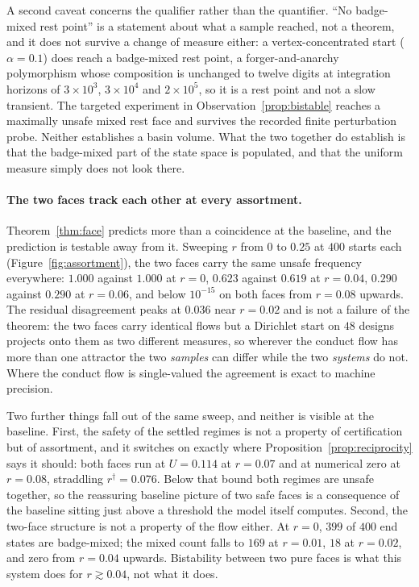 \documentclass[preprint,12pt]{elsarticle}
\theoremstyle{plain}
\theoremstyle{definition}
\begin{document}
A second caveat concerns the qualifier rather than the quantifier. ``No
badge-mixed rest point'' is a statement about what a sample reached, not a
theorem, and it does not survive a change of measure either: a
vertex-concentrated start ($\alpha = 0.1$) does reach a badge-mixed rest point,
a forger-and-anarchy polymorphism whose composition is unchanged to twelve
digits at integration horizons of $3\times10^{3}$, $3\times10^{4}$ and
$2\times10^{5}$, so it is a rest point and not a slow transient. The targeted
experiment in Observation~\ref{prop:bistable} reaches a maximally unsafe mixed
rest face and survives the recorded finite perturbation probe. Neither
establishes a basin volume. What the two together do establish is that the
badge-mixed part of the state space is populated, and that the uniform measure
simply does not look there.

\paragraph{The two faces track each other at every assortment.}
Theorem~\ref{thm:face} predicts more than a coincidence at the baseline, and
the prediction is testable away from it. Sweeping $r$ from $0$ to $0.25$ at
$400$ starts each (Figure~\ref{fig:assortment}), the two faces carry the same
unsafe frequency everywhere: $1.000$ against $1.000$ at $r = 0$, $0.623$
against $0.619$ at $r = 0.04$, $0.290$ against $0.290$ at $r = 0.06$, and below
$10^{-15}$ on both faces from $r = 0.08$ upwards. The residual disagreement
peaks at $0.036$ near $r = 0.02$ and is not a failure of the theorem: the two
faces carry identical flows but a $\mathrm{Dirichlet}$ start on $48$ designs
projects onto them as two different measures, so wherever the conduct flow has
more than one attractor the two \emph{samples} can differ while the two
\emph{systems} do not. Where the conduct flow is single-valued the agreement is
exact to machine precision.

Two further things fall out of the same sweep, and neither is visible at the
baseline. First, the safety of the settled regimes is not a property of
certification but of assortment, and it switches on exactly where
Proposition~\ref{prop:reciprocity} says it should: both faces run at
$U = 0.114$ at $r = 0.07$ and at numerical zero at $r = 0.08$, straddling
$r^{\dagger} = 0.076$. Below that bound both regimes are unsafe together, so
the reassuring baseline picture of two safe faces is a consequence of the
baseline sitting just above a threshold the model itself computes. Second, the
two-face structure is not a property of the flow either. At $r = 0$, $399$ of
$400$ end states are badge-mixed; the mixed count falls to $169$ at
$r = 0.01$, $18$ at $r = 0.02$, and zero from $r = 0.04$ upwards. Bistability
between two pure faces is what this system does for $r \gtrsim 0.04$, not what
it does.
\end{document}
